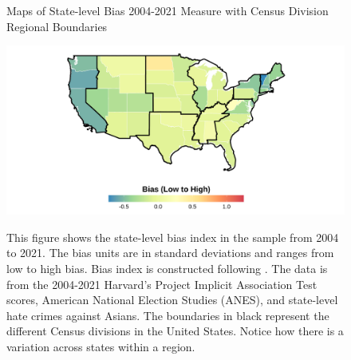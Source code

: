 \begin{center}
\begin{figure}[H]
\caption{Maps of State-level Bias 2004-2021 Measure with Census Division Regional Boundaries}
\includegraphics[width=\textwidth]{Average_Skinmap.png} 
\label{fig:iat-map-all}
\caption*{\footnotesize{This figure shows the state-level bias index in the sample from 2004 to 2021. The bias units are in standard deviations and ranges from low to high bias. Bias index is constructed following \textcite{lubotskyInterpretationRegressionsMultiple2006}. The data is from the 2004-2021 Harvard's Project Implicit Association Test scores, American National Election Studies (ANES), and state-level hate crimes against Asians. The boundaries in black represent the different Census divisions in the United States. Notice how there is a variation across states within a region.}}
\end{figure}
\end{center}

\pagebreak
\newpage

